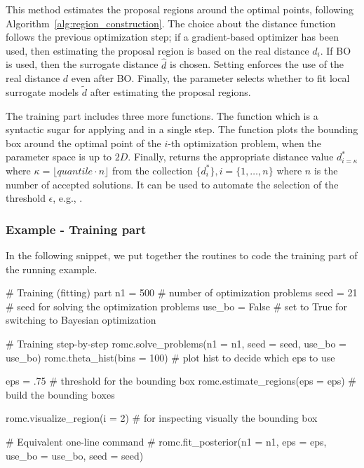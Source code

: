\documentclass[nojss]{jss}
\begin{document}
\noindent
This method estimates the proposal regions around the optimal points,
following Algorithm~\ref{alg:region_construction}. The choice about
the distance function follows the previous optimization step; if a
gradient-based optimizer has been used, then estimating the proposal
region is based on the real distance \(d_i\). If BO is used, then the
surrogate distance \(\hat{d}\) is chosen. Setting
 enforces the use of the real distance \(d\)
even after BO. Finally, the parameter  selects
whether to fit local surrogate models \(\tilde{d}\) after estimating
the proposal regions.

\noindent
The training part includes three more functions. The function
 which is a syntactic sugar for
applying  and  in a
single step. The function  plots the
bounding box around the optimal point of the \(i\)-th optimization
problem, when the parameter space is up to \(2D\). Finally,
 returns the appropriate distance
value \(d_{i=\kappa}^*\) where
\(\kappa = \lfloor quantile \cdot n \rfloor\) from the collection
\(\{ d_i^* \}, i = \{1, \ldots, n\}\) where \(n\) is the number
of accepted solutions. It can be used to automate the selection of the
threshold \(\epsilon\), e.g.,
.


\subsubsection*{Example - Training part}


In the following snippet, we put together the routines to code the
training part of the running example.

\begin{Code}
# Training (fitting) part
n1 = 500 # number of optimization problems
seed = 21 # seed for solving the optimization problems
use_bo = False # set to True for switching to Bayesian optimization

# Training step-by-step
romc.solve_problems(n1 = n1, seed = seed, use_bo = use_bo)
romc.theta_hist(bins = 100) # plot hist to decide which eps to use

eps = .75 # threshold for the bounding box
romc.estimate_regions(eps = eps) # build the bounding boxes

romc.visualize_region(i = 2) # for inspecting visually the bounding box

# Equivalent one-line command
# romc.fit_posterior(n1 = n1, eps = eps, use_bo = use_bo, seed = seed)
\end{Code}
\end{document}
